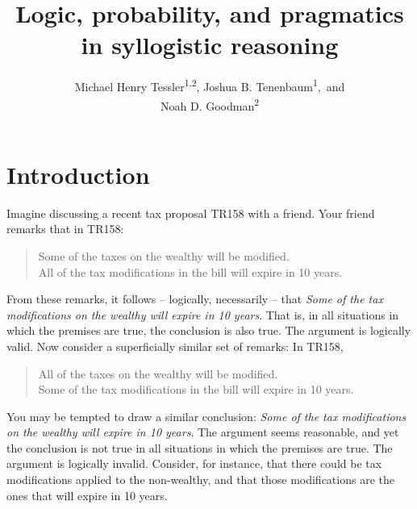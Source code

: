 \documentclass[floatsintext, doc]{apa6}
\title{Logic, probability, and pragmatics in syllogistic reasoning}
\author{Michael Henry Tessler\textsuperscript{1}\textsuperscript{,2}, Joshua B. Tenenbaum\textsuperscript{1},~and \\Noah D. Goodman\textsuperscript{2}}
\date{}
\affiliation{
\vspace{0.5cm}
\textsuperscript{1} Department of Brain and Cognitive Sciences, Massachusetts Institute of Technology \\
\textsuperscript{2} Department of Psychology, Stanford University
}
\date{}
\newenvironment{aquote}[1]
{\savebox\mybox{#1}\begin{quote}} {\signed{\usebox\mybox}\end{quote}}
\begin{document}
\maketitle




\newpage

\section{Introduction}

Imagine discussing a recent tax proposal TR158 with a friend. Your friend remarks that in TR158:

\begin{quote}
Some of the taxes on the wealthy will be modified. \\
All of the tax modifications in the bill will expire in 10 years.
\end{quote}

From these remarks, it follows -- logically, necessarily -- that \emph{Some of the tax modifications on the wealthy will expire in 10 years}.
That is, in all situations in which the premises are true, the conclusion is also true. 
The argument is logically valid.
Now consider a superficially similar set of remarks: In TR158,

\begin{quote}
All of the taxes on the wealthy will be modified. \\
Some of the tax modifications in the bill will expire in 10 years.
\end{quote}

You may be tempted to draw a similar conclusion:  \emph{Some of the tax modifications on the wealthy will expire in 10 years}.
The argument seems reasonable, and yet the conclusion is not true in all situations in which the premises are true.
The argument is logically invalid.
Consider, for instance, that there could be tax modifications applied to the non-wealthy, and that those modifications are the ones that will expire in 10 years.
\end{document}
